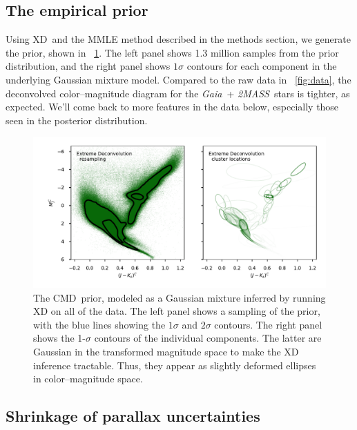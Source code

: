 \documentclass[modern]{aastex61}
\newcommand{\acronym}[1]{{\small{#1}}}
\newcommand{\project}[1]{\textsl{#1}}
\newcommand{\tmass}{\project{\acronym{2MASS}}}
\newcommand{\gaia}{\project{Gaia}}
\newcommand{\xd}{\acronym{XD}}
\newcommand{\cmd}{\acronym{CMD}}
\begin{document}
\subsection{The empirical prior}
Using \xd\ and the MMLE method described in the methods section, we generate the
prior, shown in \figurename~\ref{fig:prior}.
The left panel shows 1.3 million samples from the prior distribution, and the
right panel shows $1\sigma$ contours for each component in the underlying
Gaussian mixture model.
Compared to the raw data in \figurename~\ref{fig:data}, the deconvolved
color--magnitude diagram for the \gaia\ + \tmass\ stars is tighter, as expected.
We'll come back to more features in the data below, especially those seen in the posterior distribution.
\begin{figure}
\centering
  \includegraphics[width=\textwidth]{prior.pdf}
\caption{The \cmd\ prior, modeled as a Gaussian mixture inferred by
  running XD on all of the data. The left panel shows a sampling of
  the prior, with the blue lines showing the $1\sigma$ and $2\sigma$
  contours. The right panel shows the 1-$\sigma$ contours of the
  individual components. The latter are Gaussian in the transformed
  magnitude space to make the XD inference tractable. Thus, they
  appear as slightly deformed ellipses in color--magnitude space.}
\label{fig:prior}
\end{figure}

\subsection{Shrinkage of parallax uncertainties}
\end{document}
